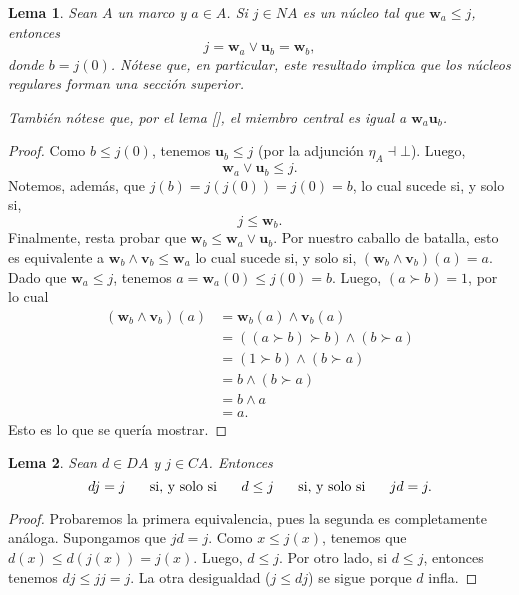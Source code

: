 \documentclass[12pt,letterpaper,titlepage]{article}
\newtheorem{lemma}{Lema}
\theoremstyle{definition}
\renewcommand\sup{\vee}
\renewcommand\inf{\wedge}
\newcommand\ssi{\hspace{5mm}\text{ si, y solo si }\hspace{5mm}}
\newcommand\unuc[1]{\mathbf u_{#1}}
\newcommand\vnuc[1]{\mathbf v_{#1}}
\newcommand\wnuc[1]{\mathbf w_{#1}}
\newcommand\<{\langle}
\renewcommand\>{\rangle}
\begin{document}
\begin{lemma}
    Sean $A$ un marco y $a\in A$.
    Si $j\in NA$ es un núcleo tal que $\wnuc a\leq j$, entonces
    \[
        j = \wnuc a \sup\unuc b = \wnuc b
    ,\]
    donde $b=j(0)$.
    Nótese que, en particular, este resultado implica que los núcleos
    regulares forman una sección superior.
    
    También nótese que, por el lema
    [],
    el miembro central es igual a $\wnuc a\unuc b$.
\end{lemma}
\begin{proof}
    Como $b\leq j(0)$, tenemos
    $\unuc b\leq j$ (por la adjunción $\eta_A\dashv \bot$).
    Luego,
    \[
        \wnuc a\sup\unuc b\leq j
    .\]
    Notemos, además, que $j(b)=j(j(0))=j(0)=b$,
    lo cual sucede si, y solo si,
    \[
        j \leq \wnuc b
    .\]
    Finalmente, resta probar que
    $\wnuc b\leq \wnuc a\sup\unuc b$.
    Por nuestro caballo de batalla,
    esto es equivalente a $\wnuc b\inf\vnuc b\leq \wnuc a$
    lo cual sucede si, y solo si, $(\wnuc b\inf\vnuc b)(a)=a$.
    Dado que $\wnuc a\leq j$, tenemos
    $a=\wnuc a(0)\leq j(0)=b$.
    Luego, $(a\succ b)=1$, por lo cual
    \begin{align*}
        (\wnuc b\inf\vnuc b)(a)
        &= \wnuc b(a)\inf \vnuc b(a) \\
        &= ((a\succ b)\succ b)\inf (b\succ a) \\
        &= (1\succ b) \inf (b\succ a)\\
        &= b \inf (b\succ a) \\
        &= b\inf a \\
        &= a.
    \end{align*}
    Esto es lo que se quería mostrar.
\end{proof}


\begin{lemma}
    Sean $d\in DA$ y $j\in CA$.
    Entonces
    \[
        dj=j \ssi d\leq j \ssi jd=j
    .\]
\end{lemma}
\begin{proof}
    Probaremos la primera equivalencia,
    pues la segunda es completamente análoga.
    Supongamos que $jd=j$.
    Como $x\leq j(x)$, tenemos que $d(x)\leq d(j(x))=j(x)$.
    Luego, $d\leq j$.
    Por otro lado, si $d\leq j$, entonces tenemos
    $dj\leq jj=j$.
    La otra desigualdad ($j\leq dj$) se sigue porque $d$ infla.
\end{proof}
\end{document}
